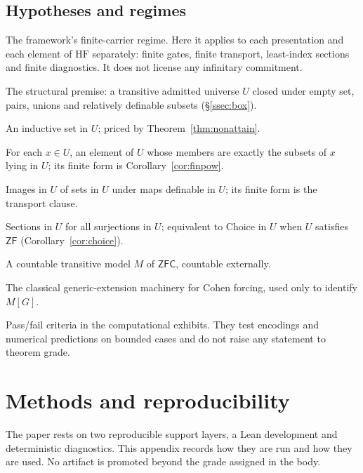 \documentclass[11pt]{article}
\newcommand{\HF}{\mathrm{HF}}                 \newcommand{\rank}{\operatorname{rank}}
\theoremstyle{definition}
\begin{document}
\subsection{Hypotheses and regimes}\label{subsec:gate-predicates-list}

\begin{description}[style=multiline,leftmargin=!,labelwidth=0.27\textwidth,labelsep=0.8em,itemsep=3pt]
\item[\textbf{A\_FIN}.] The framework's finite-carrier regime. Here it applies to each
presentation and each element of $\HF$ separately: finite gates, finite transport, least-index
sections and finite diagnostics. It does not license any infinitary commitment.
\item[\textbf{(S)}.] The structural premise: a transitive admitted universe $U$ closed under empty
set, pairs, unions and relatively definable subsets (\S\ref{ssec:box}).
\item[\textbf{C-INF}.] An inductive set in $U$; priced by Theorem~\ref{thm:nonattain}.
\item[\textbf{C-POW}.] For each $x\in U$, an element of $U$ whose members are exactly the subsets of
$x$ lying in $U$; its finite form is Corollary~\ref{cor:finpow}.
\item[\textbf{C-REPL}.] Images in $U$ of sets in $U$ under maps definable in $U$; its finite form
is the transport clause.
\item[\textbf{C-SEL}.] Sections in $U$ for all surjections in $U$; equivalent to Choice in $U$ when
$U$ satisfies $\mathsf{ZF}$ (Corollary~\ref{cor:choice}).
\item[\textbf{J1}.] A countable transitive model $M$ of $\mathsf{ZFC}$, countable externally.
\item[\textbf{J2}.] The classical generic-extension machinery for Cohen forcing, used only to
identify $M[G]$.
\item[Diagnostic gates.] Pass/fail criteria in the computational exhibits. They test encodings and
numerical predictions on bounded cases and do not raise any statement to theorem grade.
\end{description}
 \section{Methods and reproducibility}\label{app:methods}

The paper rests on two reproducible support layers, a Lean development and deterministic
diagnostics. This appendix records how they are run and how they are used. No artifact is promoted
beyond the grade assigned in the body.
\end{document}
